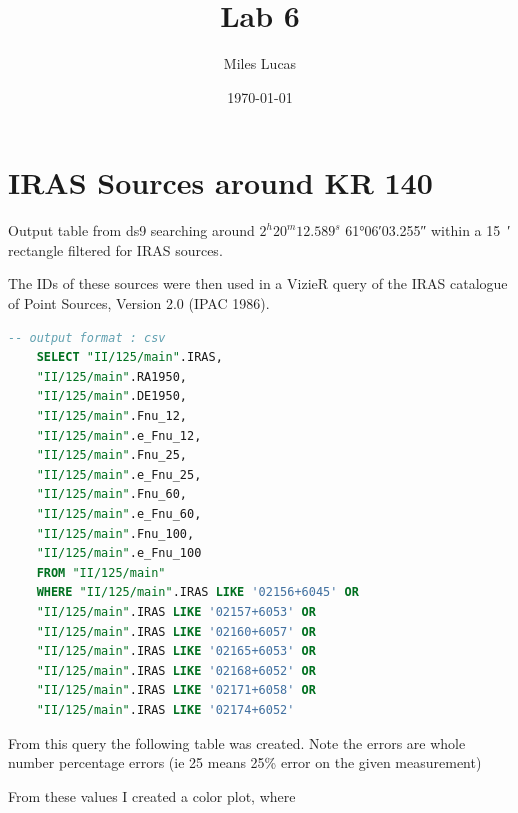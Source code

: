 \documentclass[]{article}
\title{Lab 6}
\author{Miles Lucas}
\date{\today}
\begin{document}
\maketitle

\section{IRAS Sources around KR 140}

Output table from ds9 searching around $ 2^h 20^m 12.589^s $ \ang{+61;06;03.255} within a \SI{15}{\arcminute} rectangle filtered for IRAS sources.


The IDs of these sources were then used in a VizieR query of the IRAS catalogue of Point Sources, Version 2.0 (IPAC 1986).

\begin{lstlisting}[language=SQL,basicstyle=\footnotesize,frame=single,]
	-- output format : csv
	SELECT "II/125/main".IRAS,  
	"II/125/main".RA1950,  
	"II/125/main".DE1950,  
	"II/125/main".Fnu_12,  
	"II/125/main".e_Fnu_12,  
	"II/125/main".Fnu_25,
	"II/125/main".e_Fnu_25,  
	"II/125/main".Fnu_60,  
	"II/125/main".e_Fnu_60,  
	"II/125/main".Fnu_100,  
	"II/125/main".e_Fnu_100  
	FROM "II/125/main"
	WHERE "II/125/main".IRAS LIKE '02156+6045' OR
	"II/125/main".IRAS LIKE '02157+6053' OR
	"II/125/main".IRAS LIKE '02160+6057' OR
	"II/125/main".IRAS LIKE '02165+6053' OR
	"II/125/main".IRAS LIKE '02168+6052' OR
	"II/125/main".IRAS LIKE '02171+6058' OR
	"II/125/main".IRAS LIKE '02174+6052'
\end{lstlisting}

From this query the following table was created. Note the errors are whole number percentage errors (ie 25 means 25\% error on the given measurement)


From these values I created a color plot, where 
\end{document}
